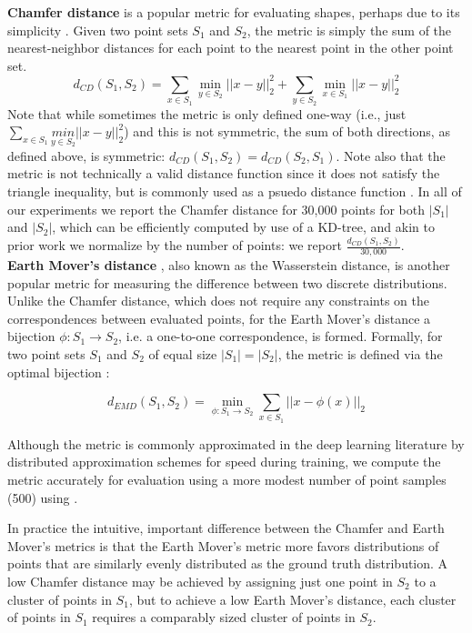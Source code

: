 \documentclass[10pt,twocolumn,letterpaper]{article}
\begin{document}
\textbf{Chamfer distance} is a popular metric for evaluating shapes, perhaps due to its simplicity \cite{fan2017point}. Given two point sets $S_1$ and $S_2$, the metric is simply the sum of the nearest-neighbor distances for each point to the nearest point in the other point set.
%
$$d_{CD}(S_1,S_2) = \sum_{x \in S_1} \underset{y \in S_2}{\min}||x-y||_2^2 + \sum_{y \in S_2} \underset{x \in S_1}{\min}||x-y||_2^2$$
%
Note that while sometimes the metric is only defined one-way (i.e., just $\sum_{x \in S_1} \underset{y \in S_2}{min}||x-y||_2^2$) and this is not symmetric, the sum of both directions, as defined above, is symmetric: $d_{CD}(S_1,S_2) =d_{CD}(S_2,S_1)$.  Note also that the metric is not technically a valid distance function since it does not satisfy the triangle inequality, but is commonly used as a psuedo distance function \cite{fan2017point}. In all of our experiments we report the Chamfer distance for 30,000 points for both $|S_1|$ and $|S_2|$, which can be efficiently computed by use of a KD-tree, and akin to prior work \cite{groueix2018atlasnet} we normalize by the number of points: we report $\frac{d_{CD}(S_1,S_2)}{30,000}$.\\

\textbf{Earth Mover's distance} \cite{rubner1998metric}, also known as the Wasserstein distance, is another popular metric for measuring the difference between two discrete distributions.  Unlike the Chamfer distance, which does not require any constraints on the correspondences between evaluated points, for the Earth Mover's distance a bijection $\phi: S_1 \rightarrow S_2$, i.e. a one-to-one correspondence, is formed.  Formally, for two point sets $S_1$ and $S_2$ of equal size $|S_1| = |S_2|$, the metric is defined via the optimal bijection \cite{fan2017point}:

$$d_{EMD}(S_1,S_2) = \underset{\phi: S_1 \rightarrow S_2}{\min} \sum_{x \in S_1} || x- \phi(x) ||_2$$

Although the metric is commonly approximated in the deep learning literature \cite{fan2017point} by distributed approximation schemes \cite{bertsekas1985distributed} for speed during training, we compute the metric accurately for evaluation using a more modest number of point samples (500) using \cite{pyemd}.

In practice the intuitive, important difference between the Chamfer and Earth Mover's metrics is that the Earth Mover's metric more favors distributions of points that are similarly evenly distributed as the ground truth distribution.  A low Chamfer distance may be achieved by assigning just one point in $S_2$ to a cluster of points in $S_1$, but to achieve a low Earth Mover's distance, each cluster of points in $S_1$ requires a comparably sized cluster of points in $S_2$.\\
   
\end{document}
